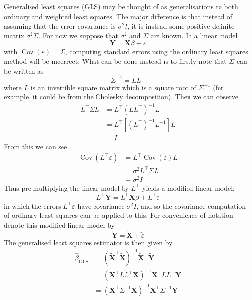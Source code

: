 \documentclass[11pt]{report} %
\begin{document}
Generalised least squares (GLS) may be thought of as generalisations to both ordinary and weighted least squares. The major difference is that instead of assuming that the error covariance is $\sigma^{2}I$, it is instead some positive definite matrix $\sigma^{2}\Sigma$. For now we suppose that $\sigma^{2}$ and $\Sigma$ are known. In a linear model
\begin{equation}
\mathbf{Y} = \mathbf{X}\beta + \varepsilon
\end{equation}
with $\operatorname{Cov}\left(\varepsilon\right) = \Sigma$, computing standard errors using the ordinary least squares method will be incorrect. What can be done instead is to firstly note that $\Sigma$ can be written as
\begin{equation}
\Sigma^{-1} = LL^{\top}
\end{equation}
where $L$ is an invertible square matrix which is a square root of $\Sigma^{-1}$ (for example, it could be from the Cholesky decomposition). Then we can observe
\begin{align}
L^{\top}\Sigma L &= L^{\top} \left(LL^{\top}\right)^{-1} L \\
&= L^{\top}\left[\left(L^{\top}\right)^{-1}L^{-1}\right]L \\
&= I
\end{align}
From this we can see
\begin{align}
\operatorname{Cov}\left(L^{\top}\varepsilon\right) &= L^{\top}\operatorname{Cov}\left(\varepsilon\right)L \\
&= \sigma^{2}L^{\top}\Sigma L \\
&= \sigma^{2}I
\end{align}
Thus pre-multiplying the linear model by $L^{\top}$ yields a modified linear model:
\begin{equation}
L^{\top}\mathbf{Y} = L^{\top}\mathbf{X}\beta + L^{\top}\varepsilon
\end{equation}
in which the errors $L^{\top}\varepsilon$ have covariance $\sigma^{2}I$, and so the covariance computation of ordinary least squares can be applied to this. For convenience of notation denote this modified linear model by
\begin{equation}
\widetilde{\mathbf{Y}} = \widetilde{\mathbf{X}} + \widetilde{\varepsilon}
\end{equation}
The generalised least squares estimator is then given by
\begin{align}
\widehat{\beta}_{\mathrm{GLS}} &= \left(\widetilde{\mathbf{X}}^{\top}\widetilde{\mathbf{X}}\right)^{-1}\widetilde{\mathbf{X}}^{\top}\widetilde{\mathbf{Y}} \\
&= \left(\mathbf{X}^{\top}LL^{\top}\mathbf{X}\right)^{-1}\mathbf{X}^{\top}LL^{\top}\mathbf{Y} \\
&= \left(\mathbf{X}^{\top}\Sigma^{-1}\mathbf{X}\right)^{-1}\mathbf{X}^{\top}\Sigma^{-1}\mathbf{Y}
\end{align}
\end{document}
